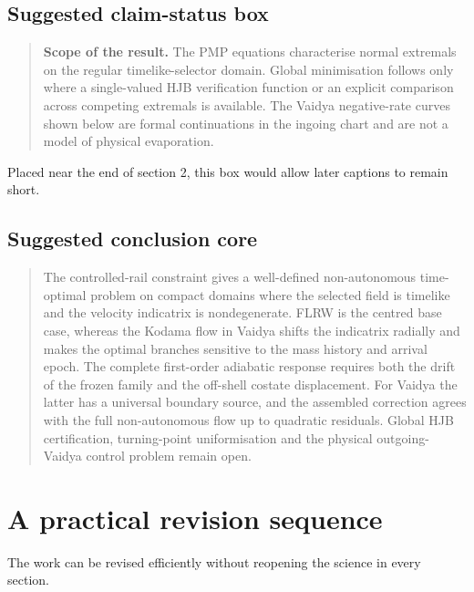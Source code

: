 \documentclass[11pt,a4paper]{article}
\begin{document}
\subsection{Suggested claim-status box}

\begin{quote}
\textbf{Scope of the result.}  The PMP equations characterise normal extremals on the regular
timelike-selector domain.  Global minimisation follows only where a single-valued HJB verification
function or an explicit comparison across competing extremals is available.  The Vaidya
negative-rate curves shown below are formal continuations in the ingoing chart and are not a model
of physical evaporation.
\end{quote}

Placed near the end of section 2, this box would allow later captions to remain short.

\subsection{Suggested conclusion core}

\begin{quote}
The controlled-rail constraint gives a well-defined non-autonomous time-optimal problem on compact
domains where the selected field is timelike and the velocity indicatrix is nondegenerate.  FLRW
is the centred base case, whereas the Kodama flow in Vaidya shifts the indicatrix radially and makes
the optimal branches sensitive to the mass history and arrival epoch.  The complete first-order
adiabatic response requires both the drift of the frozen family and the off-shell costate
displacement.  For Vaidya the latter has a universal boundary source, and the assembled correction
agrees with the full non-autonomous flow up to quadratic residuals.  Global HJB certification,
turning-point uniformisation and the physical outgoing-Vaidya control problem remain open.
\end{quote}

\section{A practical revision sequence}

The work can be revised efficiently without reopening the science in every section.
\end{document}
